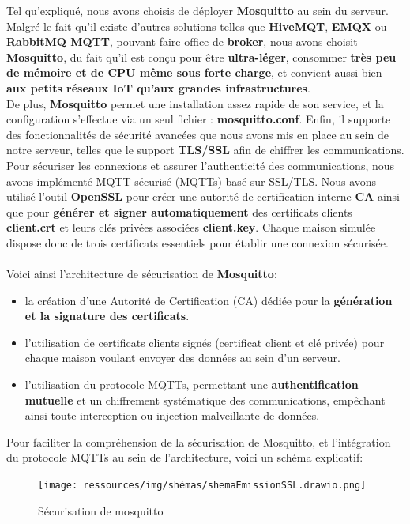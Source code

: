 \documentclass[10pt, a4paper]{report}
\begin{document}
	Tel qu'expliqué, nous avons choisis de déployer \textbf{Mosquitto} au sein du serveur. Malgré le fait qu'il existe d'autres solutions telles que \textbf{HiveMQT}, \textbf{EMQX} ou \textbf{RabbitMQ MQTT}, pouvant faire office de \textbf{broker}, nous avons choisit \textbf{Mosquitto}, du fait qu'il est conçu pour être \textbf{ultra-léger}, consommer \textbf{très peu de mémoire et de CPU même sous forte charge}, et convient aussi bien \textbf{aux petits réseaux IoT qu'aux grandes infrastructures}.\\
	De plus, \textbf{Mosquitto} permet une installation assez rapide de son service, et la configuration s'effectue via un seul fichier : \textbf{mosquitto.conf}. Enfin, il supporte des fonctionnalités de sécurité avancées que nous avons mis en place au sein de notre serveur, telles que le support \textbf{TLS/SSL} afin de chiffrer les communications.\\
	Pour sécuriser les connexions et assurer l'authenticité des communications, nous avons implémenté MQTT sécurisé (MQTTs) basé sur SSL/TLS. Nous avons utilisé l’outil \textbf{OpenSSL} pour créer une autorité de certification interne \textbf{CA} ainsi que pour \textbf{générer et signer automatiquement} des certificats clients \textbf{client.crt} et leurs clés privées associées \textbf{client.key}. Chaque maison simulée dispose donc de trois certificats essentiels pour établir une connexion sécurisée.\\\\
	Voici ainsi l'architecture de sécurisation de \textbf{Mosquitto}:
	\begin{itemize}
		 \item la création d'une Autorité de Certification (CA) dédiée pour la \textbf{génération et la signature des certificats}.
		\item l'utilisation de certificats clients signés (certificat client et clé privée) pour chaque maison voulant envoyer des données au sein d'un serveur.
		\item l'utilisation du protocole MQTTs, permettant une \textbf{authentification mutuelle} et un chiffrement systématique des communications, empêchant ainsi toute interception ou injection malveillante de données.
	\end{itemize}
	
	\vspace{1cm}
	
	Pour faciliter la compréhension de la sécurisation de Mosquitto, et l'intégration du protocole MQTTs au sein de l'architecture, voici un schéma explicatif: 
	\begin{figure}[h!]
		\centering
		\texttt{[image: ressources/img/shémas/shemaEmissionSSL.drawio.png]}
		\caption{Sécurisation de mosquitto}
		\label{fig:secuMosquitto}
	\end{figure}
	
\end{document}
